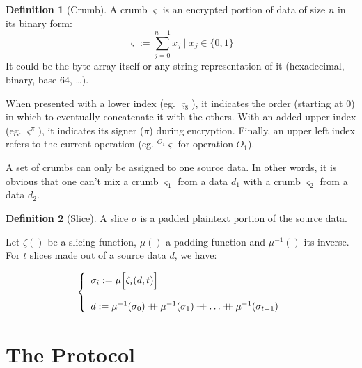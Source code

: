 \documentclass[twoside,twocolumn]{article}
\newcommand{\concat}{\mathbin{{+}\mspace{-8mu}{+}}}
\theoremstyle{definition}
\newtheorem{definition}{Definition}
\theoremstyle{remark}
\begin{document}
\begin{definition}[Crumb]
    \label{crumb}
    A crumb $\varsigma$ is an encrypted portion of data of size $n$ in its binary form:
    \begin{equation}
        \label{eq:crumb}
        \varsigma := \sum_{j=0}^{n-1} x_j \mid x_j \in \{ 0, 1 \}
    \end{equation}
    It could be the byte array itself or any string representation of it (hexadecimal, binary, base-64, \dots).

    When presented with a lower index (eg. $\varsigma_8$), it indicates the order (starting at $0$) in which to eventually concatenate it with the 
    others. With an added upper index (eg. $\varsigma^\pi)$, it indicates its signer ($\pi$) during encryption. Finally, an upper left index refers to 
    the current operation (eg. ${}^{O_1}\varsigma$ for operation $O_1$).

    A set of crumbs can only be assigned to one source data. In other words, it is obvious that one can't mix a crumb $\varsigma_1$ from a data $d_1$ 
    with a crumb $\varsigma_2$ from a data $d_2$.
\end{definition}

\begin{definition}[Slice]
    \label{slice}
    A slice $\sigma$ is a padded plaintext portion of the source data.

    Let $\zeta()$ be a slicing function, $\mu()$ a padding function and $\mu^{-1}()$ its inverse. For $t$ slices made out of a source data $d$, we have:
    \begin{small}
        \begin{equation}
            \label{eq:slice}
            \left\{
                \begin{array}{l}
                    \sigma_i := \mu \Big[ \zeta_i(d, t) \Big] \\ \\
                    d := \mu^{-1}(\sigma_0) \concat \mu^{-1}(\sigma_1) \concat \dots \concat \mu^{-1}(\sigma_{t-1}) \\
                \end{array}
            \right.
        \end{equation}
    \end{small}
\end{definition}


\section{The Protocol}
\end{document}
